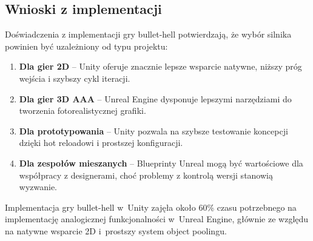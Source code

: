 \subsection{Wnioski z implementacji}

Doświadczenia z implementacji gry bullet-hell potwierdzają, że wybór silnika powinien być uzależniony od typu projektu:

\begin{enumerate}
    \item \textbf{Dla gier 2D} -- Unity oferuje znacznie lepsze wsparcie natywne, niższy próg wejścia i szybszy cykl iteracji.
    \item \textbf{Dla gier 3D AAA} -- Unreal Engine dysponuje lepszymi narzędziami do tworzenia fotorealistycznej grafiki.
    \item \textbf{Dla prototypowania} -- Unity pozwala na szybsze testowanie koncepcji dzięki hot reloadowi i prostszej konfiguracji.
    \item \textbf{Dla zespołów mieszanych} -- Blueprinty Unreal mogą być wartościowe dla współpracy 
    z designerami, choć problemy z kontrolą wersji stanowią wyzwanie.
\end{enumerate}

Implementacja gry bullet-hell w~Unity zajęła około 60\% czasu
potrzebnego na implementację analogicznej funkcjonalności
w~Unreal Engine, głównie ze względu na natywne wsparcie 2D
i~prostszy system object poolingu.
